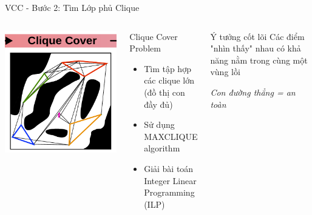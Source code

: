 \documentclass[aspectratio=169]{beamer}
\begin{document}
\begin{frame}{VCC - Bước 2: Tìm Lớp phủ Clique}
    \begin{columns}[c]
        \centering
        \includegraphics[width=\textwidth]{../imgs/VCC-2.png}

        \begin{block}{Clique Cover Problem}
            \small
            \begin{itemize}
                \item Tìm tập hợp các clique lớn (đồ thị con đầy đủ)
                \item Sử dụng MAXCLIQUE algorithm
                \item Giải bài toán Integer Linear Programming (ILP)
            \end{itemize}
        \end{block}

        \begin{exampleblock}{Ý tưởng cốt lõi}
            \small
            Các điểm "nhìn thấy" nhau có khả năng nằm trong cùng một vùng lồi
            
            \vspace{0.2cm}
            \textit{Con đường thẳng = an toàn}
        \end{exampleblock}
    \end{columns}
\end{frame}
\end{document}

